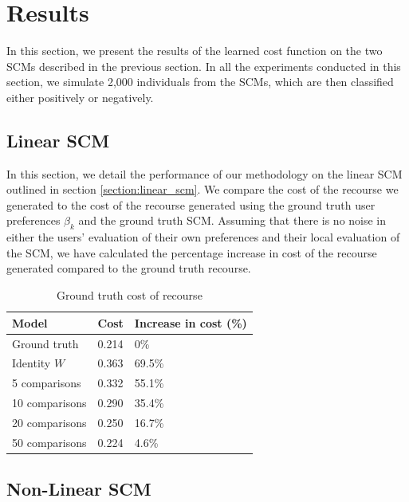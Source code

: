 \section{Results}

In this section, we present the results of the learned cost function on the two SCMs described in the previous section. In all the experiments conducted in this section, we simulate 2,000 individuals from the SCMs, which are then classified either positively or negatively.

\subsection{Linear SCM}

In this section, we detail the performance of our methodology on the linear SCM outlined in section \ref{section:linear_scm}. We compare the cost of the recourse we generated to the cost of the recourse generated using the ground truth user preferences $\beta_k$ and the ground truth SCM. Assuming that there is no noise in either the users' evaluation of their own preferences and their local evaluation of the SCM, we have calculated the percentage increase in cost of the recourse generated compared to the ground truth recourse.

\begin{table}[!htb]
	\centering
	\begin{tabular}{l|l|l}
		\hline
		\textbf{Model} & \textbf{Cost} & \textbf{Increase in cost (\%)} \\
		\hline
		Ground truth   & 0.214 & 0\%                        \\
		Identity $W$   & 0.363 & 69.5\%                     \\
		5 comparisons  & 0.332 &  55.1\%                     \\
		10 comparisons & 0.290 &  35.4\%                     \\
		20 comparisons & 0.250 &  16.7\%                     \\ 
		50 comparisons & 0.224 &  4.6\%                      \\ \hline
	\end{tabular}
	\caption{Ground truth cost of recourse }
\end{table}


\subsection{Non-Linear SCM}



